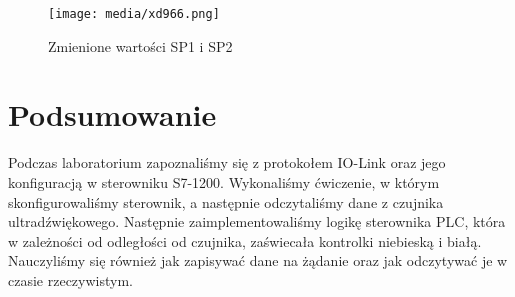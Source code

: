 \documentclass{article}
\begin{document}
\begin{figure}[H]
    \centering
    \texttt{[image: media/xd966.png]}
    \caption{Zmienione wartości SP1 i SP2}
    \label{fig:watch2}
\end{figure}

\section{Podsumowanie}

Podczas laboratorium zapoznaliśmy się z protokołem IO-Link oraz jego konfiguracją w sterowniku S7-1200. Wykonaliśmy ćwiczenie, w którym skonfigurowaliśmy sterownik, a następnie odczytaliśmy dane z czujnika ultradźwiękowego. Następnie zaimplementowaliśmy logikę sterownika PLC, która w zależności od odległości od czujnika, zaświecała kontrolki niebieską i białą. Nauczyliśmy się również jak zapisywać dane na żądanie oraz jak odczytywać je w czasie rzeczywistym.
\end{document}

